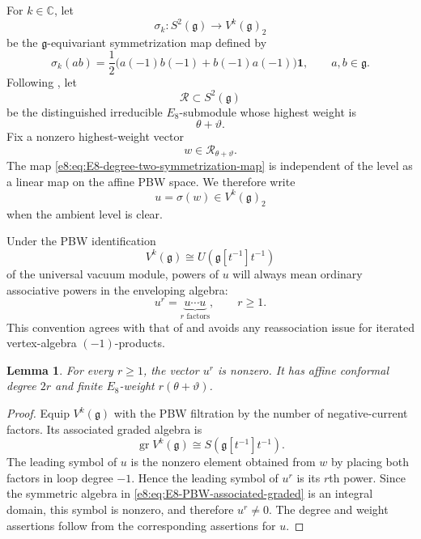 \documentclass[11pt,reqno]{amsart}
\newtheorem{lemma}[theorem]{Lemma}
\theoremstyle{definition}
\theoremstyle{remark}
\providecommand{\C}{\mathbb{C}}
\providecommand{\Vac}{\mathbf{1}}
\providecommand{\g}{\mathfrak{g}}
\providecommand{\gr}{\operatorname{gr}}
\begin{document}
For $k\in\C$, let
\begin{equation}
  \sigma_k:S^2(\g)\longrightarrow V^k(\g)_2
  \label{e8:eq:E8-degree-two-symmetrization-map}
\end{equation}
be the $\g$-equivariant symmetrization map defined by
\begin{equation*}
  \sigma_k(ab)
  =\frac12\bigl(a(-1)b(-1)+b(-1)a(-1)\bigr)\Vac,
  \qquad a,b\in\g.
\end{equation*}
Following \cite[Section~4]{ArakawaMoreau2018}, let
\begin{equation*}
  \mathcal R\subset S^2(\g)
\end{equation*}
be the distinguished irreducible $E_8$-submodule whose highest weight is
\begin{equation*}
  \theta+\vartheta.
\end{equation*}
Fix a nonzero highest-weight vector
\begin{equation*}
  w\in\mathcal R_{\theta+\vartheta}.
\end{equation*}
The map \eqref{e8:eq:E8-degree-two-symmetrization-map} is independent of the
level as a linear map on the affine PBW space.  We therefore write
\begin{equation*}
  u=\sigma(w)\in V^k(\g)_2
\end{equation*}
when the ambient level is clear.

Under the PBW identification
\begin{equation*}
  V^k(\g)\cong
  U\!\left(\g[t^{-1}]t^{-1}\right)
\end{equation*}
of the universal vacuum module, powers of $u$ will always mean ordinary
associative powers in the enveloping algebra:
\begin{equation*}
  u^r=
  \underbrace{u\cdots u}_{r\text{ factors}},
  \qquad r\ge1.
\end{equation*}
This convention agrees with that of \cite{ArakawaMoreau2018} and avoids any
reassociation issue for iterated vertex-algebra $(-1)$-products.

\begin{lemma}
\label{e8:lem:E8-PBW-powers-nonzero}
For every $r\ge1$, the vector $u^r$ is nonzero.  It has affine conformal
degree $2r$ and finite $E_8$-weight $r(\theta+\vartheta)$.
\end{lemma}

\begin{proof}
Equip $V^k(\g)$ with the PBW filtration by the number of negative-current
factors.  Its associated graded algebra is
\begin{equation}
  \gr V^k(\g)
  \cong S\!\left(\g[t^{-1}]t^{-1}\right).
  \label{e8:eq:E8-PBW-associated-graded}
\end{equation}
The leading symbol of $u$ is the nonzero element obtained from $w$ by placing
both factors in loop degree $-1$.  Hence the leading symbol of $u^r$ is its
$r$th power.  Since the symmetric algebra in
\eqref{e8:eq:E8-PBW-associated-graded} is an integral domain, this symbol is
nonzero, and therefore $u^r\neq0$.  The degree and weight assertions follow
from the corresponding assertions for $u$.
\end{proof}
\end{document}
